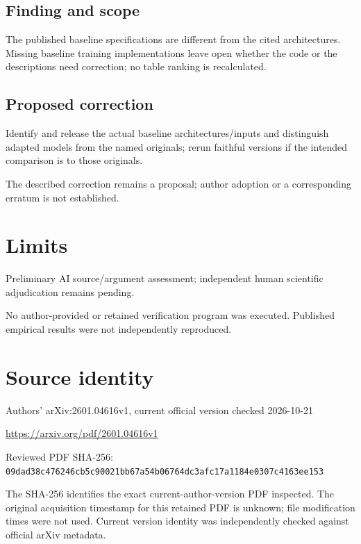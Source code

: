 \documentclass[11pt]{article}
\begin{document}
\subsection*{Finding and scope}

The published baseline specifications are different from the cited architectures. Missing baseline training implementations leave open whether the code or the descriptions need correction; no table ranking is recalculated.

\subsection*{Proposed correction}

Identify and release the actual baseline architectures/inputs and distinguish adapted models from the named originals; rerun faithful versions if the intended comparison is to those originals.

The described correction remains a proposal; author adoption or a corresponding erratum is not established.

\section*{Limits}

Preliminary AI source/argument assessment; independent human scientific adjudication remains pending.\par

No author-provided or retained verification program was executed. Published empirical results were not independently reproduced.\par

\section*{Source identity}

Authors’ arXiv:2601.04616v1, current official version checked 2026-10-21

\url{https://arxiv.org/pdf/2601.04616v1}

Reviewed PDF SHA-256: \nolinkurl{09dad38c476246cb5c90021bb67a54b06764dc3afc17a1184e0307c4163ee153}

The SHA-256 identifies the exact current-author-version PDF inspected. The original acquisition timestamp for this retained PDF is unknown; file modification times were not used. Current version identity was independently checked against official arXiv metadata.
\end{document}
